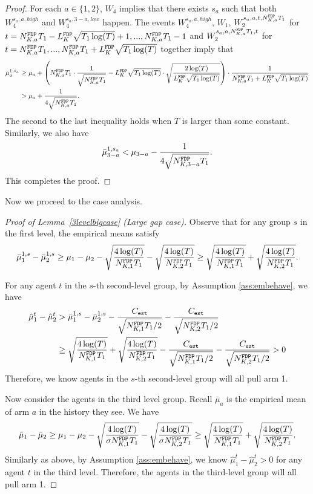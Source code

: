 \begin{proof}%
  For each $a \in \{1,2\}$, $W_4$ implies that there exists $s_a$ such
  that both $W_4^{s_a,a,high}$ and $W_4^{s_a,3-a,low}$ happen.  The
  events $W_4^{s_a,a,high}$, $W_1$, $W_2^{s_a,a,t, \fdpN T_1}$
  for $t = \fdpN T_1- \GdT \sqrt{T_1\log(T)}+1, ...,\fdpN T_1-1$ and
  $W_2^{s_a,a,\fdpN T_1,t}$ for
  $t= \fdpN T_1,...,\fdpN T_1+ \GdT \sqrt{T_1\log(T)}$ together imply that
\begin{align*}
\bar{\mu}_a ^{1,s_a} &\geq \mu_a + \left(\fdpN T_1 \cdot \frac{1}{\sqrt{\fdpN T_1}} - \GdT \sqrt{T_1\log(T)} \cdot \sqrt{\frac{2\log(T)}{ \GdT \sqrt{T_1\log(T)}}} \right) \cdot \frac{1}{\fdpN T_1+ \GdT \sqrt{T_1\log(T)}} \\
&> \mu_a + \frac{1}{4\sqrt{\fdpN T_1}}.
\end{align*}
The second to the last inequality holds when $T$ is larger than some constant.
Similarly, we also have
\[
\bar{\mu}_{3-a} ^{1,s_a} < \mu_{3-a}   - \frac{1}{4\sqrt{\fdpN[3-a] T_1}}.
\]
This completes the proof.
\end{proof}


Now we proceed to the case analysis.


\begin{proof}[Proof of Lemma~\ref{3levelbigcase} (Large gap case)]
  Observe that for any group $s$ in the first level, the empirical
  means satisfy
\[
\bar{\mu}_1^{1,s} - \bar{\mu}_2^{1,s} \geq \mu_1 -\mu_2 - \sqrt{\frac{4\log(T)}{\fdpN[1]T_1}} - \sqrt{\frac{4\log(T)}{\fdpN[2]T_1}} \geq  \sqrt{\frac{4\log(T)}{\fdpN[1]T_1}} + \sqrt{\frac{4\log(T)}{\fdpN[2]T_1}}.
\]


For any agent $t$ in the $s$-th second-level group, by Assumption \ref{ass:embehave}, we have
\begin{align*}
\hat{\mu}_1^t - \hat{\mu}_2^t &>\bar{\mu}_1^{1,s} - \bar{\mu}_2^{1,s} - \frac{\estC}{\sqrt{\fdpN[1]T_1/2}} - \frac{\estC}{\sqrt{\fdpN[2]T_1/2}}\\
&\geq  \sqrt{\frac{4\log(T)}{\fdpN[1]T_1}} + \sqrt{\frac{4\log(T)}{\fdpN[2]T_1}}- \frac{\estC}{\sqrt{\fdpN[1]T_1/2}} - \frac{\estC}{\sqrt{\fdpN[2]T_1/2}} > 0
\end{align*}
Therefore, we know agents in the $s$-th second-level group will all pull arm 1.

Now consider the agents in the third level group. Recall $\bar{\mu}_a$
is the empirical mean of arm $a$ in the history they see. We have
\[
\bar{\mu}_1 - \bar{\mu}_2 \geq \mu_1 -\mu_2 - \sqrt{\frac{4\log(T)}{\NG\fdpN[1]T_1}} - \sqrt{\frac{4\log(T)}{\NG\fdpN[2]T_1}} \geq  \sqrt{\frac{4\log(T)}{\fdpN[1]T_1}}
+ \sqrt{\frac{4\log(T)}{\fdpN[2]T_1}}.
\]
Similarly as above, by Assumption \ref{ass:embehave}, we know
$\hat{\mu}_1^t - \hat{\mu}_2^t > 0$ for any agent $t$ in the third
level. Therefore, the agents in the third-level group will all pull
arm 1.  
\end{proof}


